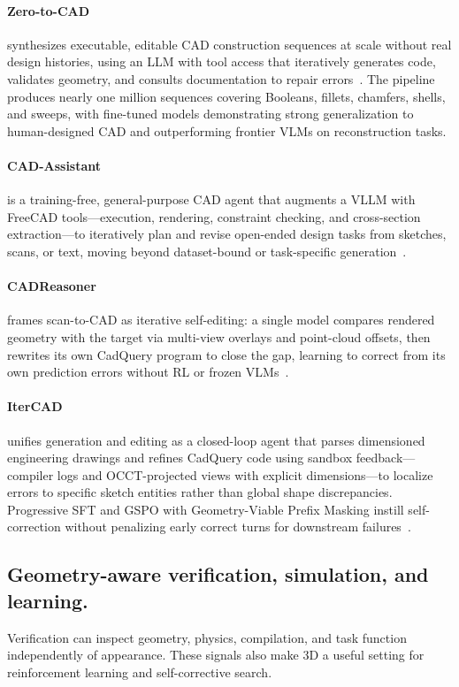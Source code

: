 \paragraph{Zero-to-CAD}
 synthesizes executable, editable CAD construction sequences at scale without real design histories, using an LLM with tool access that iteratively generates code, validates geometry, and consults documentation to repair errors~\cite{avg260424479}. The pipeline produces nearly one million sequences covering Booleans, fillets, chamfers, shells, and sweeps, with fine-tuned models demonstrating strong generalization to human-designed CAD and outperforming frontier VLMs on reconstruction tasks.

\paragraph{CAD-Assistant} is a training-free, general-purpose CAD agent that augments a VLLM with FreeCAD tools—execution, rendering, constraint checking, and cross-section extraction—to iteratively plan and revise open-ended design tasks from sketches, scans, or text, moving beyond dataset-bound or task-specific generation~\cite{mallis2024cadassistant}.

\paragraph{CADReasoner} frames scan-to-CAD as iterative self-editing: a single model compares rendered geometry with the target via multi-view overlays and point-cloud offsets, then rewrites its own CadQuery program to close the gap, learning to correct from its own prediction errors without RL or frozen VLMs~\cite{kabisov2026cadreasoner}.

\paragraph{IterCAD} unifies generation and editing as a closed-loop agent that parses dimensioned engineering drawings and refines CadQuery code using sandbox feedback—compiler logs and OCCT-projected views with explicit dimensions—to localize errors to specific sketch entities rather than global shape discrepancies. Progressive SFT and GSPO with Geometry-Viable Prefix Masking instill self-correction without penalizing early correct turns for downstream failures~\cite{hu2026itercad}.

\subsection{Geometry-aware verification, simulation, and learning.}
Verification can inspect geometry, physics, compilation, and task function independently of appearance. These signals also make 3D a useful setting for reinforcement learning and self-corrective search.


